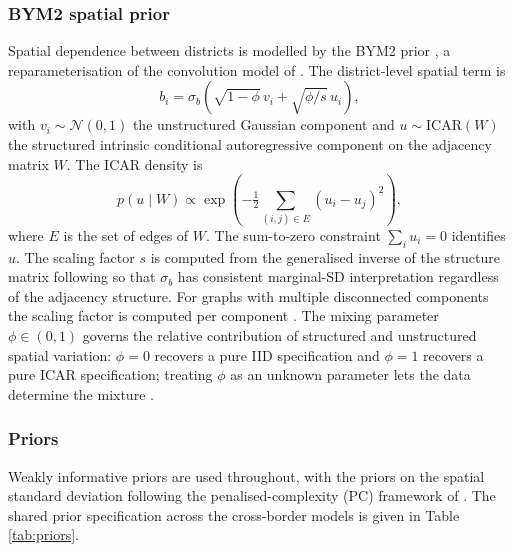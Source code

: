 \documentclass{article}
\begin{document}
\subsubsection{BYM2 spatial prior}\label{bym2-spatial-prior}

Spatial dependence between districts is modelled by the BYM2 prior
\citep{riebler2016}, a reparameterisation of the convolution model of
\citep{besag1991}. The district-level spatial term is \begin{equation}
b_i = \sigma_b\!\left(\sqrt{1-\phi}\,v_i + \sqrt{\phi/s}\,u_i\right),
\label{eq:bym2}
\end{equation} with \(v_i \sim \mathcal{N}(0, 1)\) the unstructured
Gaussian component and \(u \sim \mathrm{ICAR}(W)\) the structured
intrinsic conditional autoregressive component on the adjacency matrix
\(W\). The ICAR density is \begin{equation}
p(u \mid W) \propto
   \exp\!\left(-\tfrac{1}{2}\sum_{(i,j) \in E}(u_i - u_j)^2\right),
\end{equation} where \(E\) is the set of edges of \(W\). The sum-to-zero
constraint \(\sum_i u_i = 0\) identifies \(u\). The scaling factor \(s\)
is computed from the generalised inverse of the structure matrix
following \citep{riebler2016} so that \(\sigma_b\) has consistent
marginal-SD interpretation regardless of the adjacency structure. For
graphs with multiple disconnected components the scaling factor is
computed per component \citep{freni2018}. The mixing parameter
\(\phi \in (0, 1)\) governs the relative contribution of structured and
unstructured spatial variation: \(\phi = 0\) recovers a pure IID
specification and \(\phi = 1\) recovers a pure ICAR specification;
treating \(\phi\) as an unknown parameter lets the data determine the
mixture \citep{morris2019}.

\subsubsection{Priors}\label{priors}

Weakly informative priors are used throughout, with the priors on the
spatial standard deviation following the penalised-complexity (PC)
framework of \citep{simpson2017}. The shared prior specification across
the cross-border models is given in Table \ref{tab:priors}.

\begingroup\fontsize{8}{10}\selectfont
\end{document}
